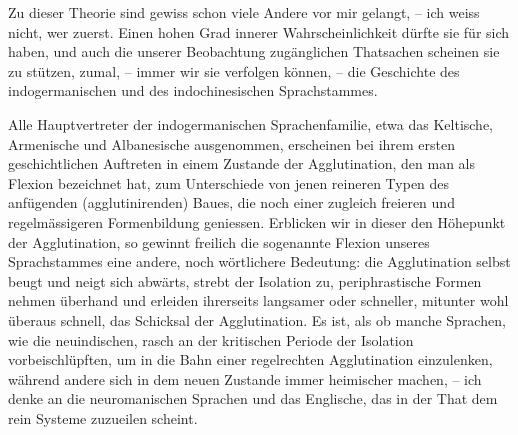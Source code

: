 {Zu dieser Theorie sind gewiss schon viele Andere vor mir gelangt, – ich weiss nicht, wer zuerst. Einen hohen Grad innerer Wahrscheinlichkeit dürfte sie für sich haben, und auch die unserer Beobachtung zugänglichen Thatsachen scheinen sie zu stützen, zumal, – immer  wir sie verfolgen können, – die Geschichte des indogermanischen und des indochinesischen Sprachstammes.

Alle Hauptvertreter der indogermanischen Sprachenfamilie, etwa das Keltische, Armenische und Albanesische ausgenommen, erscheinen bei ihrem ersten geschichtlichen Auftreten in einem Zustande der Agglutination, den man als Flexion bezeichnet hat, zum Unterschiede von jenen reineren Typen des anfügenden (agglutinirenden) Baues, die noch einer zugleich freieren und regelmässigeren Formenbildung geniessen. Erblicken wir in dieser den Höhepunkt der Agglutination, so gewinnt freilich die sogenannte Flexion unseres Sprachstammes eine andere, noch wörtlichere Bedeutung: die Agglutination selbst beugt und neigt sich abwärts, strebt der Isolation zu, periphrastische Formen nehmen überhand und erleiden ihrerseits langsamer oder schneller, mitunter wohl \label{fp.252} überaus schnell, das Schicksal der Agglutination. Es ist, als ob manche Sprachen, wie die neuindischen, rasch an der kritischen Periode der Isolation vorbeischlüpften, um in die Bahn einer regelrechten Agglutination einzulenken, während andere sich in dem neuen Zustande immer heimischer machen, – ich denke an die neuromanischen Sprachen und das Englische, das in der That dem rein  Systeme zuzueilen scheint. 

}
